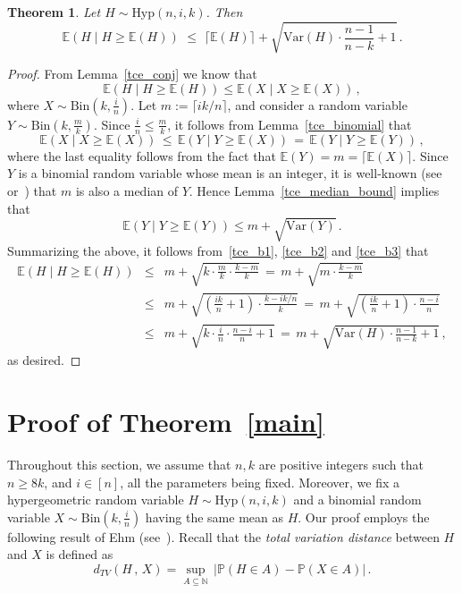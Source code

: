 \documentclass[10pt]{article}
\theoremstyle{plain}
\newtheorem{theorem}{Theorem}[section]
\theoremstyle{definition}
\theoremstyle{remark}
\newcommand{\Prb}{\mathbb{P}}
\newcommand{\Exp}{\mathbb{E}}
\begin{document}
\begin{theorem}\label{TCE_sqrt_bound}
Let $H\sim\text{Hyp}(n,i,k)$. Then 
\[
\Exp(H\mid H\ge \Exp(H)) \,\,\le \,\, \lceil\Exp(H)\rceil  + \sqrt{\text{Var}(H) \cdot \frac{n-1}{n-k} + 1} \, .
\]
\end{theorem}
\begin{proof}
From Lemma~\ref{tce_conj} we know that 
\begin{equation}\label{tce_b1}
\Exp(H \mid H\ge \Exp(H)) \le \Exp(X\mid X\ge \Exp(X)) \, ,
\end{equation}
where $X\sim\text{Bin}(k, \frac{i}{n})$.  Let  $m := \lceil ik/n\rceil$, and consider a random variable 
$Y\sim\text{Bin}(k, \frac{m}{k})$. Since $\frac{i}{n} \le \frac{m}{k}$, it follows from Lemma~\ref{tce_binomial} that 
\begin{equation}\label{tce_b2}
\Exp(X \mid X\ge \Exp(X)) \,\le\, \Exp(Y \mid Y\ge \Exp(X)) \,=\, \Exp(Y \mid Y\ge \Exp(Y)) \, ,
\end{equation}
where the last equality follows from the fact that $\Exp(Y) = m=\lceil \Exp(X)\rceil $. 
Since $Y$ is a binomial random variable whose mean is an integer, it is well-known (see~\cite{Jogdeo_Samuels} or~\cite[Theorem~2.2]{Siegel})
that $m$ is also a median of $Y$. Hence Lemma~\ref{tce_median_bound} implies that 
\begin{equation}\label{tce_b3}
\Exp(Y \mid Y\ge \Exp(Y)) \le m + \sqrt{\text{Var}(Y)} \, . 
\end{equation}
Summarizing the above, it follows from~\eqref{tce_b1}, \eqref{tce_b2} and \eqref{tce_b3} that 
\begin{eqnarray*}
\Exp(H \mid H\ge \Exp(H)) &\le& m + \sqrt{k\cdot \frac{m}{k}\cdot\frac{k-m}{k}} 
\,=\, m + \sqrt{m \cdot\frac{k-m}{k}} \\
&\le&  m + \sqrt{\left(\frac{ik}{n} +1\right) \cdot\frac{k-ik/n}{k}} 
\,=\,  m + \sqrt{\left(\frac{ik}{n} +1\right) \cdot\frac{n-i}{n}}  \\
&\le& m + \sqrt{k\cdot \frac{i}{n}\cdot \frac{n-i}{n} + 1}
\,=\, m + \sqrt{\text{Var}(H) \cdot \frac{n-1}{n-k} + 1} \, ,
\end{eqnarray*}
as desired. 
\end{proof}

\section{Proof of Theorem~\ref{main}}
\label{main_proof}

 
Throughout this section, we assume that 
$n,k$ are positive integers such that $n\ge 8k$, and  $i\in [n]$, all the parameters being fixed.
Moreover, we fix a hypergeometric random variable  $H\sim\text{Hyp}(n,i,k)$ and a binomial random variable   $X\sim\text{Bin}(k,\frac{i}{n})$  having the same mean as $H$. Our proof employs  the following  result of Ehm (see~\cite[Theorem~$2$]{Ehm}). 
Recall that the \emph{total variation distance} between $H$ and $X$ is defined as 
\[
d_{TV}(H \, , \, X) = \sup_{A\subseteq \mathbb{N}} \, |\Prb(H\in A) - \Prb(X\in A)| \, . 
\]
\end{document}

